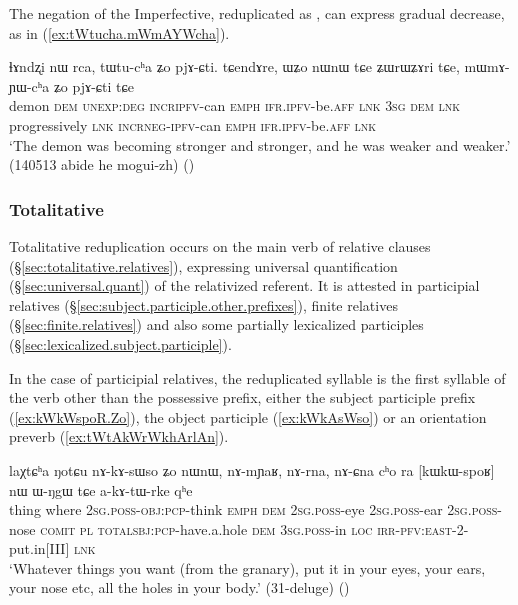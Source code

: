 The negation  of the Imperfective, reduplicated as , can express gradual decrease, as in (\ref{ex:tWtucha.mWmAYWcha}).

\begin{exe}
\ex \label{ex:tWtucha.mWmAYWcha}
\gll ɬɤndʐi nɯ rca, tɯ\redp{}tu-cʰa ʑo pjɤ-ɕti. tɕendɤre, ɯʑo nɯnɯ tɕe ʑɯrɯʑɤri tɕe, mɯ\redp{}mɤ-ɲɯ-cʰa ʑo pjɤ-ɕti tɕe \\
demon \textsc{dem} \textsc{unexp}:\textsc{deg} \textsc{incr}\redp{}\textsc{ipfv}-can \textsc{emph} \textsc{ifr}.\textsc{ipfv}-be.\textsc{aff} \textsc{lnk} \textsc{3sg} \textsc{dem} \textsc{lnk} progressively \textsc{lnk} \textsc{incr}\redp{}\textsc{neg}-\textsc{ipfv}-can \textsc{emph} \textsc{ifr}.\textsc{ipfv}-be.\textsc{aff} \textsc{lnk} \\
\glt `The demon was becoming stronger and stronger, and he was weaker and weaker.' (140513 abide he mogui-zh)
()
\end{exe}

\subsubsection{Totalitative} \label{sec:totalitative.redp}
Totalitative reduplication occurs on the main verb of relative clauses (§\ref{sec:totalitative.relatives}), expressing universal quantification (§\ref{sec:universal.quant}) of the relativized referent. It is attested in participial relatives (§\ref{sec:subject.participle.other.prefixes}), finite relatives (§\ref{sec:finite.relatives}) and also some partially lexicalized participles (§\ref{sec:lexicalized.subject.participle}).

In the case of participial relatives, the reduplicated syllable is the first syllable of the verb other than the possessive prefix, either the subject participle prefix  (\ref{ex:kWkWspoR.Zo}), the object participle  (\ref{ex:kWkAsWso}) or an orientation preverb (\ref{ex:tWtAkWrWkhArlAn}).

\begin{exe}
\ex \label{ex:kWkWspoR.Zo}
\gll laχtɕʰa ŋotɕu nɤ-kɤ-sɯso ʑo nɯnɯ, nɤ-mɲaʁ, nɤ-rna, nɤ-ɕna cʰo ra [kɯ\redp{}kɯ-spoʁ] nɯ ɯ-ŋgɯ tɕe a-kɤ-tɯ-rke qʰe \\
thing where \textsc{2sg}.\textsc{poss}-\textsc{obj}:\textsc{pcp}-think \textsc{emph} \textsc{dem} \textsc{2sg}.\textsc{poss}-eye \textsc{2sg}.\textsc{poss}-ear \textsc{2sg}.\textsc{poss}-nose \textsc{comit} \textsc{pl} \textsc{total}\redp{}\textsc{sbj}:\textsc{pcp}-have.a.hole \textsc{dem} \textsc{3sg}.\textsc{poss}-in \textsc{loc} \textsc{irr}-\textsc{pfv}:\textsc{east}-2-put.in[III] \textsc{lnk} \\
\glt `Whatever things you want (from the granary), put it in your eyes, your ears, your nose etc, all the holes in your body.' (31-deluge)
()
\end{exe}

